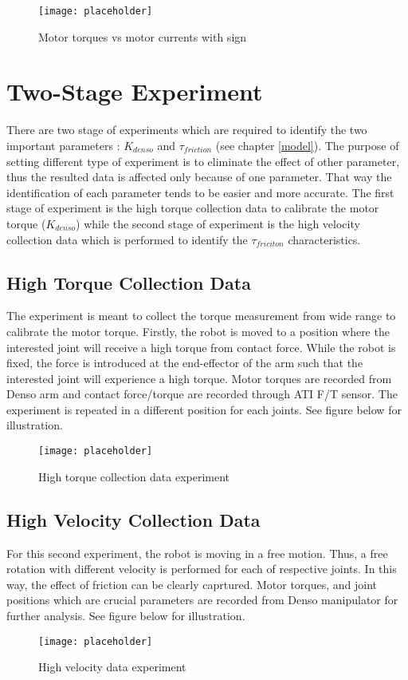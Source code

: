 \begin{figure}[h]
    \centering
    \texttt{[image: placeholder]}
    \caption{Motor torques vs motor currents with sign}
    \label{fig:current vs torque}
\end{figure}


\section{Two-Stage Experiment}
There are two stage of experiments which are required to identify the two important parameters : $K_{denso}$ and $\tau_{friction}$ (see chapter \ref{model}). The purpose of setting different type of experiment is to eliminate the effect of other parameter, thus the resulted data is affected only because of one parameter. That way the identification of each parameter tends to be easier and more accurate. The first stage of experiment is the high torque collection data to calibrate the motor torque ($K_{denso}$) while the second stage of experiment is the high velocity collection data which is performed to identify the $\tau_{friciton}$ characteristics. 


\subsection{High Torque Collection Data}

The experiment is meant to collect the torque measurement from wide range to calibrate the motor torque. Firstly, the robot is moved to a position where the interested joint will receive a high torque from contact force. While the robot is fixed, the force is introduced at the end-effector of the arm such that the interested joint will experience a high torque. Motor torques are recorded from Denso arm and contact force/torque are recorded through ATI F/T sensor. The experiment is repeated in a different position for each joints. See figure below for illustration.

\begin{figure}[h]
    \centering
    \texttt{[image: placeholder]}
    \caption{High torque collection data experiment}
\end{figure}


\subsection{High Velocity Collection Data}


For this second experiment, the robot is moving in a free motion. Thus, a free rotation with different velocity is performed for each of respective joints. In this way, the effect of friction can be clearly caprtured. Motor torques, and joint positions which are crucial parameters are recorded from Denso manipulator for further analysis. See figure below for illustration.
\begin{figure}[h]
    \centering
    \texttt{[image: placeholder]}
    \caption{High velocity data experiment}
\end{figure}


